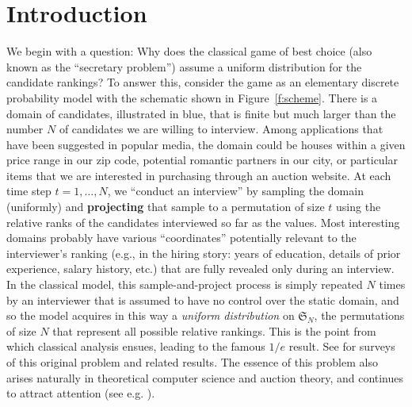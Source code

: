\documentclass[11pt]{amsart}   %
\theoremstyle{definition}
\theoremstyle{remark}
\numberwithin{equation}{section}
\theoremstyle{theorem}
\renewcommand{\S}{\mathcal{S}}
\renewcommand{\S}{\mathfrak{S}}
\begin{document}
\bigskip
\section{Introduction}

We begin with a question:  Why does the classical game of best choice (also
known as the ``secretary problem'') assume a uniform distribution for the
candidate rankings?  To answer this, consider the game as an elementary
discrete probability model with the schematic shown in Figure~\ref{f:scheme}.
There is a domain of candidates, illustrated in blue, that is finite but much
larger than the number $N$ of candidates we are willing to interview.  Among
applications that have been suggested in popular media, the domain could be
houses within a given price range in our zip code, potential romantic partners
in our city, or particular items that we are interested in purchasing through
an auction website.  At each time step $t = 1, \ldots, N$, we ``conduct an
interview'' by sampling the domain (uniformly) and {\bf projecting} that sample
to a permutation of size $t$ using the relative ranks of the candidates
interviewed so far as the values.  Most interesting domains probably have
various ``coordinates'' potentially relevant to the interviewer's ranking
(e.g., in the hiring story: years of education, details of prior experience,
salary history, etc.) that are fully revealed only during an interview.  In the
classical model, this sample-and-project process is simply repeated $N$ times
by an interviewer that is assumed to have no control over the static domain,
and so the model acquires in this way a {\em uniform distribution} on $\S_N$,
the permutations of size $N$ that represent all possible relative rankings.
This is the point from which classical analysis ensues, leading to the famous
$1/e$ result.  See \cite{gilbert--mosteller,freeman,ferguson} for surveys of
this original problem and related results.  The essence of this problem also
arises naturally in theoretical computer science and auction theory, and
continues to attract attention (see e.g.
\cite{milenkovic,pinsky,buchbinder--etal,kleinberg08}).
\end{document}
